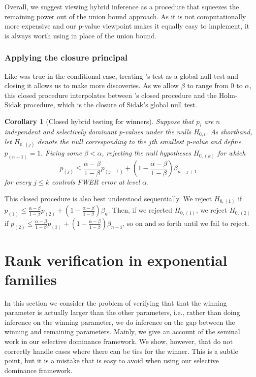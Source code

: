 \documentclass{article}
\newtheorem{corollary}{Corollary}
\begin{document}
Overall, we suggest viewing hybrid inference as a procedure that squeezes the remaining power out of the union bound approach. As it is not computationally more expensive and our p-value viewpoint makes it equally easy to implement, it is always worth using in place of the union bound. 

\subsubsection{Applying the closure principal}

Like was true in the conditional case, treating 's test as a global null test and closing it allows us to make more discoveries. As we allow $\beta$ to range from $0$ to $\alpha$, this closed procedure interpolates between 's closed procedure and the Holm-Sidak procedure, which is the closure of Sidak's global null test. 

\begin{corollary}[Closed hybrid testing for winners]
    \label{cor:hyb_closed}
    Suppose that $p_i$ are $n$ independent and selectively dominant p-values under the nulls $H_{0, i}$. As shorthand, let $H_{0, (j)}$ denote the null corresponding to the $j$th smallest p-value and define $p_{(n+1)} = 1$. Fixing some $\beta < \alpha$, rejecting the null hypotheses $H_{0, (k)}$ for which
    \begin{equation*}
        p_{(j)} \leq \frac{\alpha - \beta}{1-\beta} p_{(j-1)} + \left(1 - \frac{\alpha - \beta}{1-\beta} \right) \beta_{n - j + 1}   
    \end{equation*}
    for every $j \leq k$ controls FWER error at level $\alpha$. 
\end{corollary}

This closed procedure is also best understood sequentially. We reject $H_{0, (1)}$ if $p_{(1)} \leq \frac{\alpha - \beta}{1-\beta} p_{(2)} + (1 - \frac{\alpha - \beta}{1-\beta}) \beta_n$. Then, if we rejected $H_{0, (1)}$, we reject $H_{0, (2)}$ if $p_{(2)} \leq  \frac{\alpha - \beta}{1-\beta} p_{(3)} + (1 - \frac{\alpha -\beta }{1-\beta}) \beta_{n-1}$, so on and so forth until we fail to reject. 


\section{Rank verification in exponential families}
\label{sec:rank_verification}

In this section we consider the problem of verifying that that the winning parameter is actually larger than the other parameters, i.e., rather than doing inference on the winning parameter, we do inference on the gap between the winning and remaining parameters. Mainly, we give an account of the seminal work \cite{Hung2019} in our selective dominance framework. We show, however, that \cite{Hung2019} do not correctly handle cases where there can be ties for the winner. This is a subtle point, but it is a mistake that is easy to avoid when using our selective dominance framework.
\end{document}
